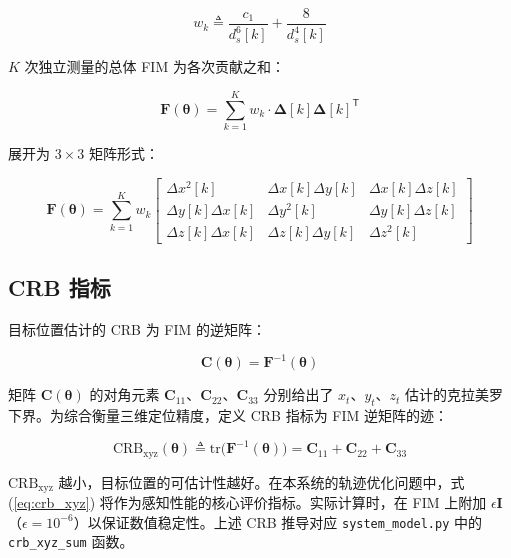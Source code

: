 \begin{equation}
w_k\triangleq\frac{c_1}{d_s^6[k]}+\frac{8}{d_s^4[k]}
\label{eq:weight_k}
\end{equation}

$K$ 次独立测量的总体 FIM 为各次贡献之和：

\begin{equation}
\mathbf{F}(\bm{\theta})=\sum_{k=1}^{K}w_k\cdot\bm{\Delta}[k]\bm{\Delta}[k]^{\mathsf{T}}
\label{eq:fim_total}
\end{equation}

展开为 $3\times 3$ 矩阵形式：

\begin{equation}
\mathbf{F}(\bm{\theta})=\sum_{k=1}^{K} w_k
\begin{bmatrix}
\Delta x^2[k] & \Delta x[k]\Delta y[k] & \Delta x[k]\Delta z[k] \\[3pt]
\Delta y[k]\Delta x[k] & \Delta y^2[k] & \Delta y[k]\Delta z[k] \\[3pt]
\Delta z[k]\Delta x[k] & \Delta z[k]\Delta y[k] & \Delta z^2[k]
\end{bmatrix}
\label{eq:fim_matrix}
\end{equation}

\subsection{CRB 指标}

目标位置估计的 CRB 为 FIM 的逆矩阵：

\begin{equation}
\mathbf{C}(\bm{\theta})=\mathbf{F}^{-1}(\bm{\theta})
\label{eq:crb_matrix}
\end{equation}

矩阵 $\mathbf{C}(\bm{\theta})$ 的对角元素 $\mathbf{C}_{11}$、$\mathbf{C}_{22}$、$\mathbf{C}_{33}$ 分别给出了 $x_t$、$y_t$、$z_t$ 估计的克拉美罗下界。为综合衡量三维定位精度，定义 CRB 指标为 FIM 逆矩阵的迹：

\begin{equation}
\mathrm{CRB}_{\mathrm{xyz}}(\bm{\theta})\triangleq\mathrm{tr}\bigl(\mathbf{F}^{-1}(\bm{\theta})\bigr)=\mathbf{C}_{11}+\mathbf{C}_{22}+\mathbf{C}_{33}
\label{eq:crb_xyz}
\end{equation}

$\mathrm{CRB}_{\mathrm{xyz}}$ 越小，目标位置的可估计性越好。在本系统的轨迹优化问题中，式 (\ref{eq:crb_xyz}) 将作为感知性能的核心评价指标。实际计算时，在 FIM 上附加 $\epsilon\mathbf{I}$（$\epsilon=10^{-6}$）以保证数值稳定性。上述 CRB 推导对应 \texttt{system\_model.py} 中的 \texttt{crb\_xyz\_sum} 函数。

